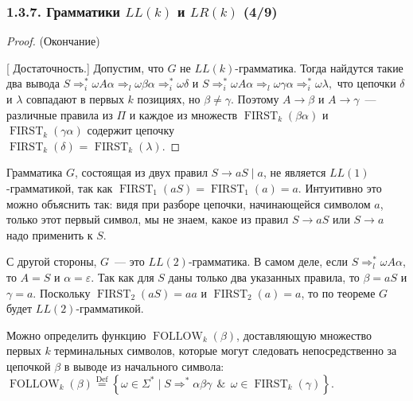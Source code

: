 \documentclass[mathserif,12pt,aspectratio=169]{beamer}
\def\Set#1#2{\left\{ #1 \mid #2 \right\}}
\def\Def{\stackrel{\text{Def}}{=}}
\def\And{\operatorname{\,\&\,}}
\def\proofsection#1{\par{\color{brown}\sffamily\small  [\;}{\sffamily\small\color{brown} #1}{\sffamily\small\color{brown}\;]}\;}
\begin{document}
\begin{frame}
\frametitle{1.3.7. Грамматики $LL(k)$ и $LR(k)$ (4/9)}
\begin{proof} (Окончание)
\proofsection{Достаточность.}
Допустим, что \( G \) не $LL(k)$-грамматика. Тогда найдутся такие два вывода 
\(
S \Rightarrow_i^* \omega A\alpha \Rightarrow_l \omega \beta \alpha \Rightarrow_i^* \omega \delta
\)
и
\(
S \Rightarrow_i^* \omega A\alpha \Rightarrow_l \omega \gamma \alpha \Rightarrow_i^* \omega \lambda,
\)
что цепочки \( \delta \) и \( \lambda \) совпадают в первых \( k \) позициях, но \( \beta \neq \gamma \). Поэтому \( A \to \beta \) и \( A \to \gamma \)~---
 различные правила из \( \Pi \) и каждое из множеств \( \operatorname{FIRST}_k(\beta \alpha) \) и \( \operatorname{FIRST}_k(\gamma \alpha) \) содержит цепочку\\ \( \operatorname{FIRST}_k(\delta) \) = \( \operatorname{FIRST}_k(\lambda) \).
\end{proof}


\begin{example} Грамматика $G$, состоящая из двух правил $S \to aS \mid a$, 
не является $LL(1)$-грамматикой, 
так как $\operatorname{FIRST}_1(aS) = \operatorname{FIRST}_1(a) = a$. 
Интуитивно это можно объяснить так: видя при разборе цепочки, начинающейся символом $a$, только этот первый символ, мы не знаем, какое из правил $S \to aS$ или $S \to a$ надо применить к $S$.

С другой стороны, $G$~--- это $LL(2)$-грамматика. В самом деле, если $S \Rightarrow^*_l \omega A\alpha$, то $A = S$ и $\alpha = \varepsilon$. Так как для $S$ даны только два указанных правила, то $\beta = aS$ и $\gamma = a$. Поскольку $\operatorname{FIRST}_2(aS) = aa$ и $\operatorname{FIRST}_2(a) = a$, то по теореме $G$ будет $LL(2)$-грамматикой.
\end{example} 

\begin{digress} Можно определить функцию 
$\operatorname{FOLLOW}_k(\beta)$, доставляющую
множество первых $k$ терминальных символов, которые могут следовать непосредственно за цепочкой $\beta$ в выводе из начального символа:
$
\operatorname{FOLLOW}_k(\beta) \Def \Set{\omega\in \Sigma^*}{ S \Rightarrow^*
 \alpha \beta \gamma \And \omega \in \operatorname{FIRST}_k(\gamma) }
$.
\end{digress}


\end{frame}
\end{document}
